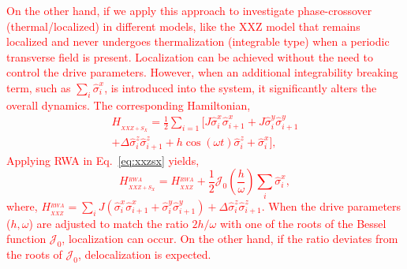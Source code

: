 \documentclass[%
reprint,
superscriptaddress,
amsmath,amssymb,
aps,
prb,
showkeys,
]{revtex4-2}
\newcommand{\red}[1]{\textcolor{red}{#1}}
\begin{document}
	\red{On the other hand, if we apply this approach to investigate phase-crossover (thermal/localized) in different models, like the XXZ model that remains localized and never undergoes thermalization (integrable type) when a periodic transverse field is present. Localization can be achieved without the need to control the drive parameters. However, when an additional integrability breaking term, such as $\sum_i \hat{\sigma}^x_i$, is introduced into the system, it significantly alters the overall dynamics. The corresponding Hamiltonian,
	\begin{multline}
		H_{_{XXZ+S_{X}}} = \frac12 \sum_{i=1} \bigg[ J \hat{\sigma}^x_i \hat{\sigma}^x_{i+1} +J  \hat{\sigma}^y_i \hat{\sigma}^y_{i+1}\\ + \Delta  \hat{\sigma}^z_i \hat{\sigma}^z_{i+1} + h\cos(\omega t)  \hat{\sigma}^z_i + \hat{\sigma}^x_i\bigg],
		\label{eq:xxzsx}
	\end{multline}
	Applying RWA in Eq.~\eqref{eq:xxzsx} yields,
	\begin{equation}
		H_{_{XXZ+S_{X}}}^{_{RWA}} =H_{_{XXZ}}^{_{RWA}} +  \frac12 \mathcal{J}_0 \left(\frac{h}{\omega}\right)\sum_i \hat{\sigma}^x_i,
		\label{eq:xxzsxrwa}
	\end{equation}
	where, $\displaystyle H_{_{XXZ}}^{_{RWA}} =\sum_i J\left( \hat{\sigma}^x_i \hat{\sigma}^x_{i+1} + \hat{\sigma}^y_i \hat{\sigma}^y_{i+1} \right) + \Delta \hat{\sigma}_{i}^{z} \hat{\sigma}_{i+1}^{z}$. When the drive parameters ($h, \omega$) are adjusted to match the ratio $2h/\omega$ with one of the roots of the Bessel function $\mathcal{J}_0$, localization can occur. On the other hand, if the ratio deviates from the roots of $\mathcal{J}_0$, delocalization is expected.}
\end{document}
